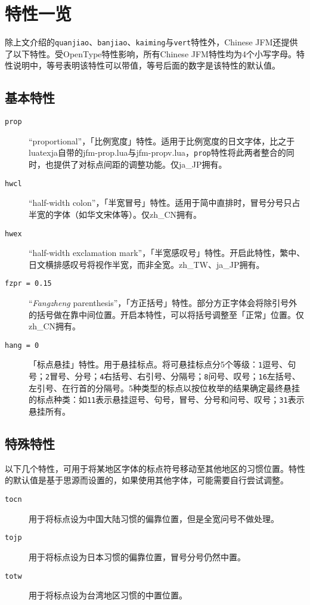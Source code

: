 \documentclass[a4paper , zihao=-4 , punct=zh_CN/kaiming]{ctexart}
\begin{document}
\section{特性一览}
除上文介绍的\+\verb|quanjiao|、\verb|banjiao|、\verb|kaiming|与\+\verb|vert|特性外，\textsf{Chinese JFM}还提供了以下特性。受OpenType特性影响，所有\textsf{Chinese JFM}特性均为4个小写字母。特性说明中，等号表明该特性可以带值，等号后面的数字是该特性的默认值。

\subsection{基本特性}
\begin{description}
    \item[\texttt{prop}] ``proportional''，「比例宽度」特性。适用于比例宽度的日文字体，比之于\textsf{lua\-texja}自带的\textsf{jfm-prop.lua}与\textsf{jfm-propv.lua}，\verb|prop|特性将此两者整合的同时，也提供了对标点间距的调整功能。仅\textsf{ja\_JP}拥有。
    \item[\texttt{hwcl}] ``half-width colon''，「半宽冒号」特性。适用于简中直排时，冒号分号只占半宽的字体（如华文宋体等）。仅\textsf{zh\_CN}拥有。
    \item[\texttt{hwex}] ``half-width exclamation mark''，「半宽感叹号」特性。开启此特性，繁中、日文横排感叹号将视作半宽，而非全宽。\textsf{zh\_TW}、\textsf{ja\_JP}拥有。
    \item[\texttt{fzpr = 0.15}] ``\textit{Fangzheng} parenthesis''，「方正括号」特性。部分方正字体会将除引号外的括号做在靠中间位置。开启本特性，可以将括号调整至「正常」位置。仅\textsf{zh\_CN}拥有。
    \item[\texttt{hang = 0}] 「标点悬挂」特性。用于悬挂标点。将可悬挂标点分5个等级：\verb|1|逗号、句号；\verb|2|冒号、分号；\verb|4|右括号、右引号、分隔号；\verb|8|问号、叹号；\verb|16|左括号、左引号、在行首的分隔号。5种类型的标点以按位枚举的结果确定最终悬挂的标点种类：如\+\verb|11|表示悬挂逗号、句号，冒号、分号和问号、叹号；\verb|31|表示悬挂所有。
\end{description}

\subsection{特殊特性}
以下几个特性，可用于将某地区字体的标点符号移动至其他地区的习惯位置。特性的默认值是基于思源而设置的，如果使用其他字体，可能需要自行尝试调整。
\begin{description}
    \item[\texttt{tocn}] 用于将标点设为中国大陆习惯的偏靠位置，但是全宽问号不做处理。
    \item[\texttt{tojp}] 用于将标点设为日本习惯的偏靠位置，冒号分号仍然中置。
    \item[\texttt{totw}] 用于将标点设为台湾地区习惯的中置位置。
\end{description}
\end{document}
